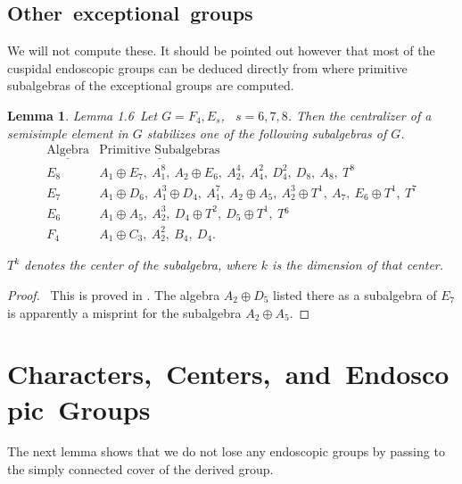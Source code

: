 \documentclass{memo-l}
\newtheorem{lemma}[theorem]{Lemma}
\theoremstyle{definition}
\theoremstyle{remark}
\numberwithin{section}{chapter}
\numberwithin{equation}{chapter}
\begin{document}
\subsection{Other\  exceptional\  groups}

   We will not compute these.  It should be pointed out however that most
of the cuspidal endoscopic groups can be deduced directly from \cite{MR0338284} where
primitive subalgebras of the exceptional groups are computed.

\setcounter{theorem}{5} %

\begin{lemma}{Lemma 1.6}\ Let $G  =  F_{4}, E_{s}$, \ $s = 6,7,8$.  Then the
centralizer of a semisimple element in $G$ stabilizes one of the following
subalgebras of $G$.
$$
\begin{matrix}
{\underline{{\text{Algebra}}}} & {\underline{{\text{Primitive\ Subalgebras}}}} \\
E_{8} &  A_{1}\oplus E_{7},\ A_{1}^{8},\ A_{2}\oplus E_{6},\ A_{2}^{4},\ A_{4}^{2},\
D_{4}^{2},\ D_{8},\ A_{8},\ T^{8} \\
E_{7} & A_{1}\oplus D_{6},\ A_{1}^{3}\oplus D_{4},\ A_{1}^{7},\ A_{2}\oplus A_{5},\
A_{2}^{3}\oplus T^{1},\ A_{7},\ E_{6}\oplus T^{1},\ T^{7} \\
E_{6} & A_{1}\oplus A_{5},\ A_{2}^{3},\ D_{4}\oplus T^{2},\ D_{5}\oplus T^{1},\
T{}^{6} \\
F_{4} & A_{1}\oplus C_{3},\ A_{2}^{2},\ B_{4},\ D_{4} .
\end{matrix}
$$

\noindent
$T^{k}$ denotes the center of the subalgebra, where $k$ is the dimension of
that center.
\end{lemma}


\begin{proof} \ This is proved in \cite{MR0338284}.  The algebra $A_{2}\oplus D_{5}$
listed there as a subalgebra of $E_{7}$ is apparently a misprint for the
subalgebra $A_{2}\oplus  A_{5}$.
\end{proof}



\section{Characters,\ Centers,\ and\ Endoscopic\ Groups}

   The next lemma shows that we do not lose any endoscopic groups by
passing to the simply connected cover of the derived group.
\end{document}
